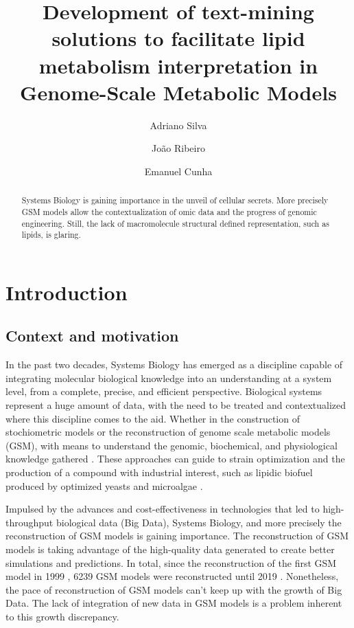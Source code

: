 \documentclass{llncs}
\begin{document}
\pagestyle{myheadings}
\title{Development of text-mining solutions to facilitate lipid metabolism interpretation in Genome-Scale Metabolic Models}

\author{Adriano Silva\and
João Ribeiro\and
Emanuel Cunha}

%
\maketitle              %
%
\begin{abstract}
Systems Biology is gaining importance in the unveil of cellular secrets. More precisely GSM models allow the contextualization of omic data and the progress of genomic engineering.
Still, the lack of macromolecule structural defined representation, such as lipids, is glaring.

\end{abstract}
%
%
%
\section{Introduction}
\subsection{Context and motivation}
In the past two decades, Systems Biology has emerged as a discipline capable of integrating molecular biological knowledge into an understanding at a system level, from a complete, precise, and efficient perspective.
Biological systems represent a huge amount of data, with the need to be treated and contextualized where this discipline comes to the aid.  
Whether in the construction of stochiometric models or the reconstruction of genome scale metabolic models (GSM), with means to understand the genomic, biochemical, and physiological knowledge gathered \cite{Zou2018,Tavassoly2018}. 
These approaches can guide to strain optimization and the production of a compound with industrial interest, such as lipidic biofuel produced by optimized yeasts and microalgae \cite{Sawangkeaw2013}.

Impulsed by the advances and cost-effectiveness in technologies that led to high-throughput biological data (Big Data), Systems Biology, and more precisely the reconstruction of GSM models is gaining importance.
The reconstruction of GSM models is taking advantage of the high-quality data generated to create better simulations and predictions. 
In total, since the reconstruction of the first GSM model in 1999 \cite{Edwards1999}, 6239 GSM models were reconstructed until 2019 \cite{Gu2019}. 
Nonetheless, the pace of reconstruction of GSM models can't keep up with the growth of Big Data. The lack of integration of new data in GSM models is a problem inherent to this growth discrepancy.
\end{document}
